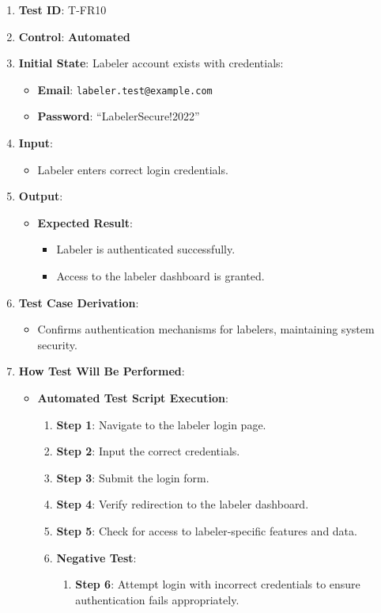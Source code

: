 \documentclass[12pt, titlepage]{article}
\begin{document}
\begin{enumerate}
    \item \textbf{Test ID}: T-FR10
    \item \textbf{Control}: \textbf{Automated}
    \item \textbf{Initial State}: Labeler account exists with credentials:
    \begin{itemize}
        \item \textbf{Email}: \texttt{labeler.test@example.com}
        \item \textbf{Password}: ``LabelerSecure!2022''
    \end{itemize}
    \item \textbf{Input}:
    \begin{itemize}
        \item Labeler enters correct login credentials.
    \end{itemize}
    \item \textbf{Output}:
    \begin{itemize}
        \item \textbf{Expected Result}:
        \begin{itemize}
            \item Labeler is authenticated successfully.
            \item Access to the labeler dashboard is granted.
        \end{itemize}
    \end{itemize}
    \item \textbf{Test Case Derivation}:
    \begin{itemize}
        \item Confirms authentication mechanisms for labelers, maintaining system security.
    \end{itemize}
    \item \textbf{How Test Will Be Performed}:
    \begin{itemize}
        \item \textbf{Automated Test Script Execution}:
        \begin{enumerate}
            \item \textbf{Step 1}: Navigate to the labeler login page.
            \item \textbf{Step 2}: Input the correct credentials.
            \item \textbf{Step 3}: Submit the login form.
            \item \textbf{Step 4}: Verify redirection to the labeler dashboard.
            \item \textbf{Step 5}: Check for access to labeler-specific features and data.
            \item \textbf{Negative Test}:
            \begin{enumerate}
                \item \textbf{Step 6}: Attempt login with incorrect credentials to ensure authentication fails appropriately.
            \end{enumerate}
        \end{enumerate}
    \end{itemize}
\end{enumerate}
\end{document}
